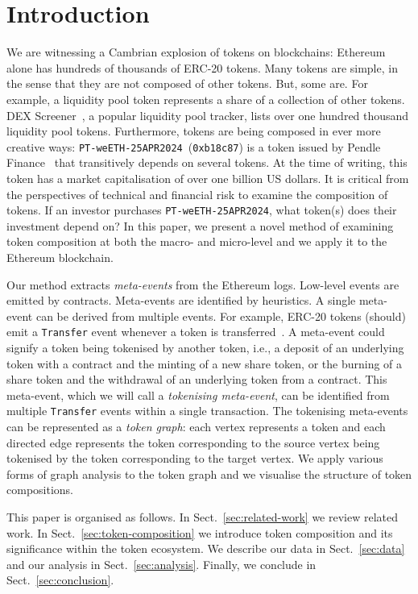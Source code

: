 \section{Introduction}\label{sec:introduction}

We are witnessing a Cambrian explosion of tokens on blockchains:
Ethereum alone has hundreds of thousands of ERC-20 tokens.  Many
tokens are simple, in the sense that they are not composed of other
tokens.  But, some are.  For example, a liquidity pool token
represents a share of a collection of other tokens.  DEX
Screener~\cite{dex-screener-xx}, a popular liquidity pool tracker,
lists over one hundred thousand liquidity pool tokens.  Furthermore,
tokens are being composed in ever more creative ways:
\texttt{PT-weETH-25APR2024}~(\texttt{0xb18c87}) is a token issued by
Pendle Finance~\cite{nguyen-vuong-22} that transitively depends on
several tokens.  At the time of writing, this token has a market
capitalisation of over one billion US dollars.  It is critical from
the perspectives of technical and financial risk to examine the
composition of tokens.  If an investor purchases
\texttt{PT-weETH-25APR2024}, what token(s) does their investment
depend on?  In this paper, we present a novel method of examining
token composition at both the macro- and micro-level and we apply it
to the Ethereum blockchain.


Our method extracts \textit{meta-events} from the Ethereum logs.
Low-level events are emitted by contracts.  Meta-events are identified
by heuristics.  A single meta-event can be derived from multiple
events.  For example, ERC-20 tokens (should) emit a \texttt{Transfer}
event whenever a token is transferred~\cite{vogelsteller-buterin-15}.
A meta-event could signify a token being tokenised by another token,
i.e., a deposit of an underlying token with a contract and the minting
of a new share token, or the burning of a share token and the
withdrawal of an underlying token from a contract.  This meta-event,
which we will call a \textit{tokenising meta-event}, can be identified
from multiple \texttt{Transfer} events within a single transaction.
The tokenising meta-events can be represented as a \textit{token
  graph}: each vertex represents a token and each directed edge
represents the token corresponding to the source vertex being
tokenised by the token corresponding to the target vertex.  We apply
various forms of graph analysis to the token graph and we visualise
the structure of token compositions.

This paper is organised as follows.  In Sect.~\ref{sec:related-work}
we review related work.  In Sect.~\ref{sec:token-composition} we
introduce token composition and its significance within the token
ecosystem.  We describe our data in Sect.~\ref{sec:data} and our
analysis in Sect.~\ref{sec:analysis}.  Finally, we conclude in
Sect.~\ref{sec:conclusion}.
